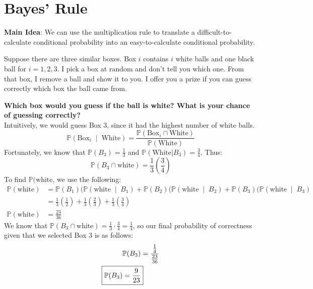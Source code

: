 \documentclass[titlepage, 12pt, leqno]{article}
\begin{document}
\section{Bayes' Rule}
\textbf{Main Idea}: We can use the multiplication rule to translate a difficult-to-calculate conditional probability into an easy-to-calculate conditional probability.

\begin{ex}
    Suppose there are three similar boxes. Box $i$ contains $i$ white balls and one black ball for $i = 1,2,3$. I pick a box at random and don't tell you which one. From that box, I remove a ball and show it to you. I offer you a prize if you can guess correctly which box the ball came from. 

    \textbf{Which box would you guess if the ball is white? What is your chance of guessing correctly?} \\[.1in]
    Intuitively, we would guess Box 3, since it had the highest number of white balls.
    \[
    \mathbb{P}\left(\text{Box}_i \;\middle|\; \text{White}\right) = \frac{\mathbb{P}(\text{Box}_i \cap \text{White})}{\mathbb{P}(\text{White})}
    \]
    Fortunately, we know that $\mathbb{P}(B_3) = \frac{1}{3}$ and $\mathbb{P}(\text{White}| B_3) = \frac{3}{4}$. Thus:
    \[
    \mathbb{P}(B_3 \cap \text{white}) = \frac{1}{3}\left(\frac{3}{4}\right) 
    \]
    To find $\mathbb{P}(\text{white}$, we use the following:
   \begin{align*}
       \mathbb{P}(\text{white}) &= \mathbb{P}(B_1)( \mathbb{P}\left(\text{white} \;\middle|\; B_1\right) + \mathbb{P}(B_2)( \mathbb{P}\left(\text{white} \;\middle|\; B_2\right) + \mathbb{P}(B_3)( \mathbb{P}\left(\text{white} \;\middle|\; B_3\right) \\
                                &= \frac{1}{3} \left(\frac{1}{2}\right) + \frac{1}{3} \left(\frac{2}{3} \right) + \frac{1}{3} \left(\frac{3}{4} \right) \\
       \mathbb{P}(\text{white}) &= \frac{23}{36}
   \end{align*}
    We know that $\mathbb{P}(B_3 \cap \text{white}) = \frac{1}{3} \cdot \frac{3}{4} = \frac{1}{4}$, so our final probability of correctness given that we selected Box 3 is as follows:
   \begin{align*}
       \mathbb{P}(B_3) &= \frac{\frac{1}{4} }{\frac{23}{36}} \\
       \Aboxed{\mathbb{P}(B_3) = \frac{9}{23}} 
   \end{align*}
\end{ex}
\end{document}
